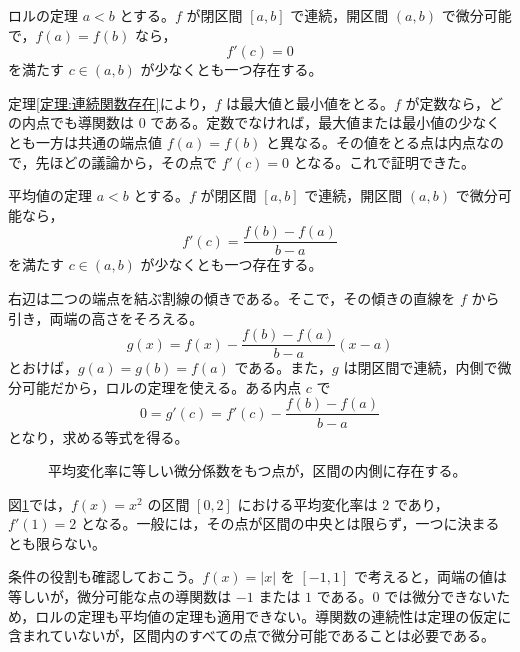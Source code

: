 \begin{theorem}{ロルの定理}\label{定理:ロル}
$a<b$ とする。$f$ が閉区間 $[a,b]$ で連続，開区間 $(a,b)$ で微分可能で，$f(a)=f(b)$ なら，
\[
 f'(c)=0
\]
を満たす $c\in(a,b)$ が少なくとも一つ存在する。
\end{theorem}

定理\ref{定理:連続関数存在}により，$f$ は最大値と最小値をとる。$f$ が定数なら，どの内点でも導関数は $0$ である。定数でなければ，最大値または最小値の少なくとも一方は共通の端点値 $f(a)=f(b)$ と異なる。その値をとる点は内点なので，先ほどの議論から，その点で $f'(c)=0$ となる。これで証明できた。

\begin{theorem}{平均値の定理}\label{定理:平均値}
$a<b$ とする。$f$ が閉区間 $[a,b]$ で連続，開区間 $(a,b)$ で微分可能なら，
\[
 f'(c)=\frac{f(b)-f(a)}{b-a}
\]
を満たす $c\in(a,b)$ が少なくとも一つ存在する。
\end{theorem}

右辺は二つの端点を結ぶ割線の傾きである。そこで，その傾きの直線を $f$ から引き，両端の高さをそろえる。
\[
 g(x)=f(x)-\frac{f(b)-f(a)}{b-a}(x-a)
\]
とおけば，$g(a)=g(b)=f(a)$ である。また，$g$ は閉区間で連続，内側で微分可能だから，ロルの定理を使える。ある内点 $c$ で
\[
 0=g'(c)=f'(c)-\frac{f(b)-f(a)}{b-a}
\]
となり，求める等式を得る。

\begin{figure}[htbp]
\centering
{}
\caption{平均変化率に等しい微分係数をもつ点が，区間の内側に存在する。}
\label{図:平均値定理}
\end{figure}

図\ref{図:平均値定理}では，$f(x)=x^2$ の区間 $[0,2]$ における平均変化率は $2$ であり，$f'(1)=2$ となる。一般には，その点が区間の中央とは限らず，一つに決まるとも限らない。

条件の役割も確認しておこう。$f(x)=|x|$ を $[-1,1]$ で考えると，両端の値は等しいが，微分可能な点の導関数は $-1$ または $1$ である。$0$ では微分できないため，ロルの定理も平均値の定理も適用できない。導関数の連続性は定理の仮定に含まれていないが，区間内のすべての点で微分可能であることは必要である。

